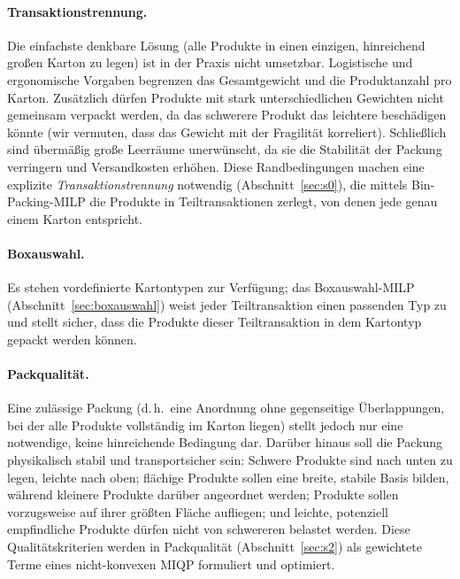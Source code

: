 \documentclass[10pt]{article}
\begin{document}
\paragraph{Transaktionstrennung.}
Die einfachste denkbare L\"osung (alle Produkte in einen einzigen,
hinreichend gro\ss en Karton zu legen) ist in der Praxis nicht
umsetzbar.
Logistische und ergonomische Vorgaben begrenzen das Gesamtgewicht und
die Produktanzahl pro Karton.
Zus\"atzlich d\"urfen Produkte mit stark unterschiedlichen Gewichten
nicht gemeinsam verpackt werden, da das schwerere Produkt das
leichtere besch\"adigen k\"onnte (wir vermuten, dass das Gewicht mit der Fragilit\"at korreliert).
Schlie\ss lich sind \"uberm\"a\ss ig gro\ss e Leerr\"aume unerw\"unscht,
da sie die Stabilit\"at der Packung verringern und Versandkosten
erh\"ohen.
Diese Randbedingungen machen eine explizite \emph{Transaktionstrennung}
notwendig (Abschnitt~\ref{sec:s0}), die mittels
Bin-Packing-MILP die Produkte in Teiltransaktionen zerlegt, von denen
jede genau einem Karton entspricht.

\paragraph{Boxauswahl.}
Es stehen vordefinierte Kartontypen zur Verfügung; das Boxauswahl-MILP (Abschnitt~\ref{sec:boxauswahl}) weist jeder Teiltransaktion einen passenden Typ zu und stellt sicher, dass die Produkte dieser Teiltransaktion in dem Kartontyp gepackt werden können.

\paragraph{Packqualit\"at.}
Eine zul\"assige Packung (d.\,h.\ eine Anordnung ohne gegenseitige
\"Uberlappungen, bei der alle Produkte vollst\"andig im Karton liegen)
stellt jedoch nur eine notwendige, keine hinreichende Bedingung dar.
Dar\"uber hinaus soll die Packung physikalisch stabil und transportsicher
sein: Schwere Produkte sind nach unten zu legen, leichte nach oben;
fl\"achige Produkte sollen eine breite, stabile Basis bilden, w\"ahrend
kleinere Produkte dar\"uber angeordnet werden; Produkte sollen vorzugsweise
auf ihrer gr\"o\ss ten Fl\"ache aufliegen; und leichte, potenziell
empfindliche Produkte d\"urfen nicht von schwereren belastet werden.
Diese Qualit\"atskriterien werden in Packqualit\"at (Abschnitt~\ref{sec:s2})
als gewichtete Terme eines nicht-konvexen MIQP formuliert und optimiert.
\end{document}
